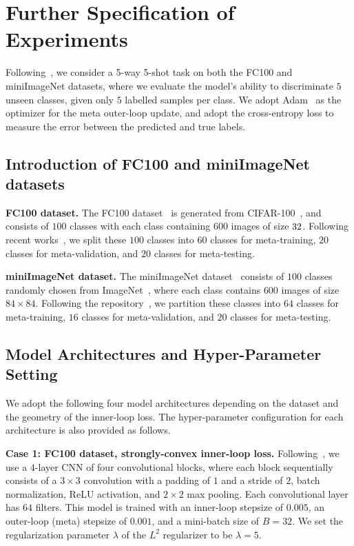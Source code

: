 \documentclass{osudissert96}
\begin{document}
\section{Further Specification of Experiments}\label{appen:exp}
Following~\cite{learn2learn2019}, we consider a 5-way 5-shot task on both the FC100 and miniImageNet datasets, where we evaluate the model's ability to discriminate $5$ unseen classes, given only $5$ labelled samples per class. We adopt Adam~\cite{kingma2014adam} as the optimizer for the meta outer-loop update, and adopt the cross-entropy loss to measure the error between the predicted and true labels. 


\subsection*{Introduction of FC100 and miniImageNet datasets}

{\bf FC100 dataset.} The FC100 dataset~\cite{oreshkin2018tadam} is generated from CIFAR-100~\cite{krizhevsky2009learning}, and consists of $100$ classes with each class containing $600$ images of size $32\time 32$. Following recent works~\cite{oreshkin2018tadam,lee2019meta}, we split these $100$ classes into $60$ classes for meta-training, $20$ classes for meta-validation, and $20$ classes for meta-testing.  

\vspace{0.2cm}
{\noindent\bf miniImageNet dataset.} The miniImageNet dataset~\cite{vinyals2016matching} consists of $100$ classes randomly chosen from ImageNet~\cite{russakovsky2015imagenet}, where each class contains $600$ images of size $84\times 84$. Following the repository~\cite{learn2learn2019}, we partition these classes into $64$ classes for meta-training, $16$ classes for meta-validation, and $20$ classes for meta-testing.

\subsection*{Model Architectures and Hyper-Parameter Setting}
We adopt the following four model architectures depending on the dataset and the geometry of the inner-loop loss. The hyper-parameter configuration for each architecture is also provided as follows. 

\vspace{0.1cm}
{\noindent\bf Case 1: FC100 dataset, strongly-convex inner-loop loss.} Following~\cite{learn2learn2019}, we use a $4$-layer CNN of four convolutional blocks, where each block sequentially consists of  a $3\times 3$ convolution with a padding of $1$ and a stride of $2$, batch normalization, ReLU activation, and $2\times 2$
max pooling. Each convolutional layer has $64$ filters. This model is trained with an inner-loop stepsize of $0.005$, an outer-loop (meta) stepsize of $0.001$, and a mini-batch size of $B=32$. We set the regularization parameter $\lambda$ of the $L^2$ regularizer  to be $\lambda =5$.
\end{document}
